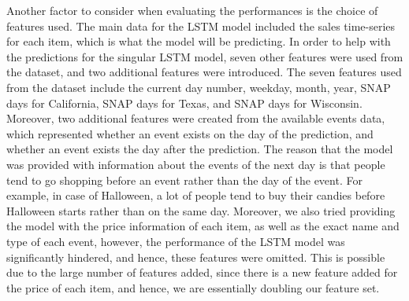 Another factor to consider when evaluating the performances is the choice of features used.
The main data for the LSTM model included the sales time-series for each item, which is what the model will be predicting. 
In order to help with the predictions for the singular LSTM model, seven other features were used from the dataset, and two additional features were introduced. 
The seven features used from the dataset include the current day number, weekday, month, year, SNAP days for California, SNAP days for Texas, and SNAP days for Wisconsin. 
Moreover, two additional features were created from the available events data, which represented whether an event exists on the day of the prediction, and whether an event exists the day after the prediction.
The reason that the model was provided with information about the events of the next day is that people tend to go shopping before an event rather than the day of the event.
For example, in case of Halloween, a lot of people tend to buy their candies before Halloween starts rather than on the same day.
Moreover, we also tried providing the model with the price information of each item, as well as the exact name and type of each event, however, the performance of the LSTM model was significantly hindered, and hence, these features were omitted.
This is possible due to the large number of features added, since there is a new feature added for the price of each item, and hence, we are essentially doubling our feature set.

